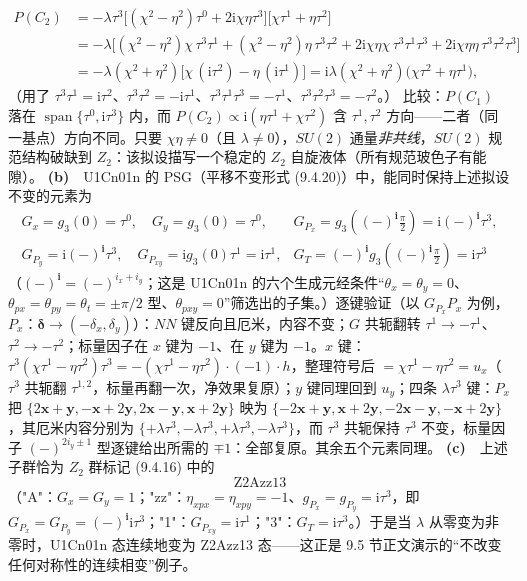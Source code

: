 \begin{align*}
P(C_2)&=-\lambda\tau^3\big[(\chi^2-\eta^2)\tau^0+2\mathrm{i}\chi\eta\tau^3\big]\big[\chi\tau^1+\eta\tau^2\big]\\
&=-\lambda\Big[(\chi^2-\eta^2)\chi\,\tau^3\tau^1+(\chi^2-\eta^2)\eta\,\tau^3\tau^2+2\mathrm{i}\chi\eta\chi\,\tau^3\tau^1\tau^3+2\mathrm{i}\chi\eta\eta\,\tau^3\tau^2\tau^3\Big]\\
&=-\lambda(\chi^2+\eta^2)\big[\chi\,(\mathrm{i}\tau^2)-\eta\,(\mathrm{i}\tau^1)\big]
=\mathrm{i}\lambda(\chi^2+\eta^2)\big(\chi\tau^2+\eta\tau^1\big),
\end{align*}
（用了 $\tau^3\tau^1=\mathrm{i}\tau^2$、$\tau^3\tau^2=-\mathrm{i}\tau^1$、$\tau^3\tau^1\tau^3=-\tau^1$、$\tau^3\tau^2\tau^3=-\tau^2$。）
比较：$P(C_1)$ 落在 $\operatorname{span}\{\tau^0,\mathrm{i}\tau^3\}$ 内，而 $P(C_2)\propto\mathrm{i}(\eta\tau^1+\chi\tau^2)$ 含 $\tau^1,\tau^2$ 方向——二者（同一基点）方向不同。只要 $\chi\eta\neq0$（且 $\lambda\neq0$），$SU(2)$ 通量\emph{非共线}，$SU(2)$ 规范结构破缺到 $Z_2$：该拟设描写一个稳定的 $Z_2$ 自旋液体（所有规范玻色子有能隙）。
\textbf{(b)}　U1Cn01n 的 PSG（平移不变形式 (9.4.20)）中，能同时保持上述拟设不变的元素为
\begin{equation*}
\boxed{\;
\begin{array}{ll}
G_x=g_3(0)=\tau^0,\quad G_y=g_3(0)=\tau^0, &
G_{P_x}=g_3((-)^{\pmb{i}}\tfrac{\pi}{2})=\mathrm{i}(-)^{\pmb{i}}\tau^3,\\[2pt]
G_{P_y}=\mathrm{i}(-)^{\pmb{i}}\tau^3,\quad
G_{P_{xy}}=\mathrm{i}g_3(0)\tau^1=\mathrm{i}\tau^1, &
G_T=(-)^{\pmb{i}}g_3((-)^{\pmb{i}}\tfrac{\pi}{2})=\mathrm{i}\tau^3
\end{array}\;}
\end{equation*}
（$(-)^{\pmb{i}}=(-)^{i_x+i_y}$；这是 U1Cn01n 的六个生成元经条件“$\theta_x=\theta_y=0$、$\theta_{px}=\theta_{py}=\theta_t=\pm\pi/2$ 型、$\theta_{pxy}=0$”筛选出的子集。）逐键验证（以 $G_{P_x}P_x$ 为例，$P_x$：$\pmb{\delta}\to(-\delta_x,\delta_y)$）：$NN$ 键反向且厄米，内容不变；$G$ 共轭翻转 $\tau^{1}\to-\tau^{1}$、$\tau^{2}\to-\tau^{2}$；标量因子在 $x$ 键为 $-1$、在 $y$ 键为 $-1$。$x$ 键：$\tau^3(\chi\tau^1-\eta\tau^2)\tau^3=-(\chi\tau^1-\eta\tau^2)\cdot(-1)\cdot h$，整理符号后 $=\chi\tau^1-\eta\tau^2=u_x$（$\tau^3$ 共轭翻 $\tau^{1,2}$，标量再翻一次，净效果复原）；$y$ 键同理回到 $u_y$；四条 $\lambda\tau^3$ 键：$P_x$ 把 $\{2\pmb{x}+\pmb{y},-\pmb{x}+2\pmb{y},2\pmb{x}-\pmb{y},\pmb{x}+2\pmb{y}\}$ 映为 $\{-2\pmb{x}+\pmb{y},\pmb{x}+2\pmb{y},-2\pmb{x}-\pmb{y},-\pmb{x}+2\pmb{y}\}$，其厄米内容分别为 $\{+\lambda\tau^3,-\lambda\tau^3,+\lambda\tau^3,-\lambda\tau^3\}$，而 $\tau^3$ 共轭保持 $\tau^3$ 不变，标量因子 $(-)^{2i_y\pm1}$ 型逐键给出所需的 $\mp1$：全部复原。其余五个元素同理。
\textbf{(c)}　上述子群恰为 $Z_2$ 群标记 (9.4.16) 中的
\begin{equation*}
\boxed{\;\text{Z2Azz13}\;}
\end{equation*}
（"A"：$G_x=G_y=1$；"zz"：$\eta_{xpx}=\eta_{xpy}=-1$、$g_{P_x}=g_{P_y}=\mathrm{i}\tau^3$，即 $G_{P_x}=G_{P_y}=(-)^{\pmb{i}}\mathrm{i}\tau^3$；"1"：$G_{P_{xy}}=\mathrm{i}\tau^1$；"3"：$G_T=\mathrm{i}\tau^3$。）于是当 $\lambda$ 从零变为非零时，U1Cn01n 态连续地变为 Z2Azz13 态——这正是 9.5 节正文演示的“不改变任何对称性的连续相变”例子。

